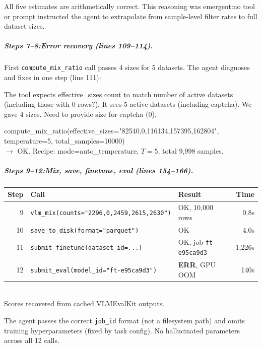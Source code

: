 \noindent All five estimates are arithmetically correct. This reasoning was emergent:no tool or prompt instructed the agent to extrapolate from sample-level filter rates to full dataset sizes.

\subparagraph{Steps 7--8:Error recovery (lines 109--114).}
First \texttt{compute\_mix\_ratio} call passes 4 sizes for 5 datasets. The agent diagnoses and fixes in one step (line 111):

\begin{agentthought}[title={Agent Thought:self-correction}]
\small\ttfamily
The tool expects effective\_sizes count to match number of active datasets (including those with 0 rows?). It sees 5 active datasets (including captcha). We gave 4 sizes. Need to provide size for captcha (0).
\end{agentthought}

\begin{toolaction}[title={Tool Call (retry)}]
\small\ttfamily compute\_mix\_ratio(effective\_sizes="82540,0,116134,157395,162804", temperature=5, total\_samples=10000)\\
\textrm{$\to$ OK. Recipe: mode=auto\_temperature, $T{=}5$, total 9{,}998 samples.}
\end{toolaction}

\subparagraph{Steps 9--12:Mix, save, finetune, eval (lines 154--166).}
\mbox{}

\begin{toolaction}[title={Tool Calls}]
\scriptsize
\begin{tabular}{@{}rllr@{}}
\toprule
\textbf{Step} & \textbf{Call} & \textbf{Result} & \textbf{Time} \\
\midrule
9  & \texttt{vlm\_mix(counts="2296,0,2459,2615,2630")} & OK, 10{,}000 rows & 0.8s \\
10 & \texttt{save\_to\_disk(format="parquet")} & OK & 4.0s \\
11 & \texttt{submit\_finetune(dataset\_id=...)} & OK, job \texttt{ft-e95ca9d3} & 1{,}226s \\
12 & \texttt{submit\_eval(model\_id="ft-e95ca9d3")} & \textbf{ERR}, GPU OOM & 140s \\
\bottomrule
\end{tabular}\\[2pt]
\textrm{Scores recovered from cached VLMEvalKit outputs.}
\end{toolaction}

\noindent The agent passes the correct \texttt{job\_id} format (not a filesystem path) and omits training hyperparameters (fixed by task config). No hallucinated parameters across all 12 calls.

